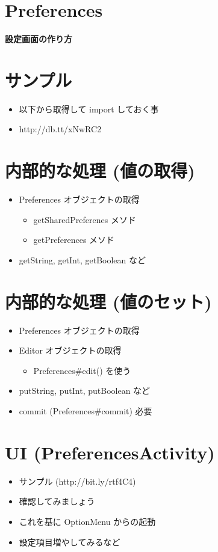 \documentclass[slide,papersize]{jsarticle}
\begin{document}
\section*{Preferences}
\vspace*{15mm}
\begin{center}
{\Huge {\bf 設定画面の作り方}}
\end{center}

\section*{サンプル}
\bigskip
\begin{itemize}
\item 以下から取得して import しておく事
\bigskip
\item http://db.tt/xNwRC2
\end{itemize}

\section*{内部的な処理 (値の取得)}
\bigskip
\begin{itemize}
\item Preferences オブジェクトの取得
 \begin{itemize}
 \item getSharedPreferenes メソド
 \item getPreferences メソド
 \end{itemize}
\bigskip
\item getString, getInt, getBoolean など
\end{itemize}

\section*{内部的な処理 (値のセット)}
\bigskip
\begin{itemize}
\item Preferences オブジェクトの取得
\bigskip
\item Editor オブジェクトの取得
 \begin{itemize}
 \item Preferences\#edit() を使う
 \end{itemize}
\bigskip
\item putString, putInt, putBoolean など
\bigskip
\item commit (Preferences\#commit) 必要
\end{itemize}

\section*{UI (PreferencesActivity)}
\bigskip
\begin{itemize}
\item サンプル (http://bit.ly/rtf4C4)
\medskip
\item 確認してみましょう
\medskip
\item これを基に OptionMenu からの起動
\medskip
\item 設定項目増やしてみるなど
\end{itemize}
\end{document}
